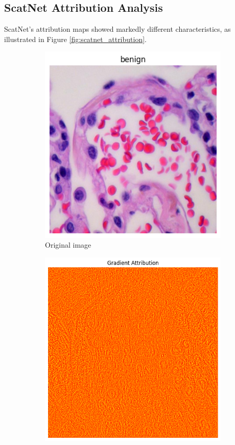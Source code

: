 \documentclass[10pt,twocolumn]{article}
\begin{document}
\subsection{ScatNet Attribution Analysis}
ScatNet's attribution maps showed markedly different characteristics, as illustrated in Figure \ref{fig:scatnet_attribution}.

\begin{figure}[h]
\centering
\begin{subfigure}{0.32\columnwidth}
\includegraphics[width=\linewidth]{imgs/normal_image.png}
\caption{Original image}
\end{subfigure}
\hfill
\begin{subfigure}{0.32\columnwidth}
\includegraphics[width=\linewidth]{imgs/scatnet_bp.png}

\end{subfigure}
\end{figure}
\end{document}
